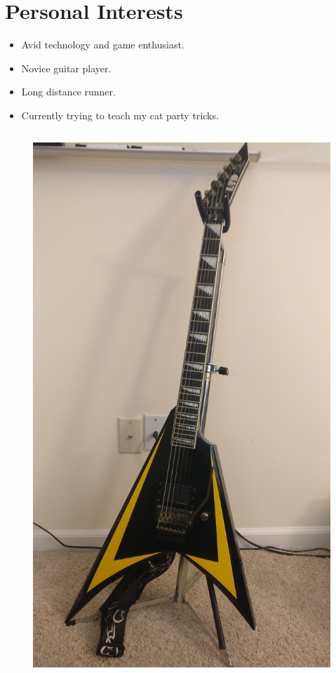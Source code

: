 \documentclass[9pt]{beamer}
\begin{document}
\section{Personal Interests}
\begin{frame}
	\begin{itemize}
		\item Avid technology and game enthusiast. 
		
		\item Novice guitar player.
		
		\item Long distance runner.
		
		\item Currently trying to teach my cat party tricks.
	\end{itemize}
	\begin{columns}
	\begin{column}{2.5cm}
		\begin{figure}
			\includegraphics[scale=0.04]{guitar.jpg}

\end{figure}
\end{column}
\end{columns}
\end{frame}
\end{document}
